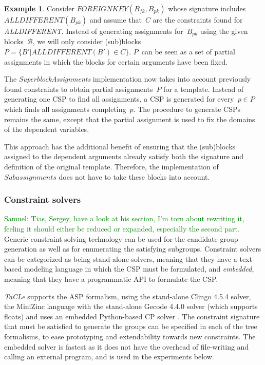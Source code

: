 \documentclass{IEEEtran}
\newcommand{\samuel}[1]{\textcolor{green}{{\sc Samuel:} #1}\xspace}
\newcommand{\format}[1]{\textit{#1}\xspace}
\newcommand{\generategroups}{\format{SuperblockAssignments}}
\newcommand{\findassignment}{\format{Subassignments}}
\newcommand{\sname}{\format{TaCLe}}
\newcommand{\blocks}{\ensuremath{\mathcal{B}}\xspace}
\newcommand{\ecfkey}[2]{\ensuremath{\textit{FOREIGNKEY}(#1,#2)}}
\newcommand{\ecalldiff}[1]{\ensuremath{\textit{ALLDIFFERENT}(#1)}}
\theoremstyle{definition}
\newtheorem{example}{Example}
\begin{document}
\begin{example}
  Consider $\ecfkey{B_{fk}}{B_{pk}}$ whose signature includes $\ecalldiff{B_{pk}}$ and assume that~$C$ are the constraints found for \textit{ALLDIFFERENT}.
  Instead of generating assignments for~$B_{pk}$ using the given blocks~$\blocks$, we will only consider (sub)blocks~$P = \{ B' | \ecalldiff{B'} \in C \}$.
  $P$~can be seen as a set of partial assignments in which the blocks for certain arguments have been fixed.
\end{example}

The \generategroups implementation now takes into account previously found constraints to obtain partial assignments~$P$ for a template.
Instead of generating one CSP to find all assignments, a CSP is generated for every~$p \in P$ which finds all assignments completing~$p$.
The procedure to generate CSPs remains the same, except that the partial assignment is used to fix the domains of the dependent variables.

This approach has the additional benefit of ensuring that the (sub)blocks assigned to the dependent arguments already satisfy both the signature and definition of the original template.
Therefore, the implementation of $\findassignment$ does not have to take these blocks into account.





\subsubsection{Constraint solvers}
\samuel{Tias, Sergey, have a look at his section, I'm torn about rewriting it, feeling it should either be reduced or expanded, especially the second part.}
Generic constraint solving technology can be used for the candidate group generation as well as for enumerating the satisfying subgroups.
Constraint solvers can be categorized as being stand-alone solvers, meaning that they have a text-based modeling language in which the CSP must be formulated, and \textit{embedded}, meaning that they have a programmatic API to formulate the CSP.

\sname supports the ASP \cite{whaisasp} formalism, using the stand-alone Clingo 4.5.4 \cite{clingo} solver, the MiniZinc language \cite{minizinc} with the stand-alone Gecode 4.4.0 solver (which supports floats) and uses an embedded Python-based CP solver \cite{python_constraint}.
The constraint signature that must be satisfied to generate the groups can be specified in each of the tree formalisms, to ease prototyping and extendability towards new constraints. The embedded solver is fastest as it does not have the overhead of file-writing and calling an external program, and is used in the experiments below.
\end{document}
